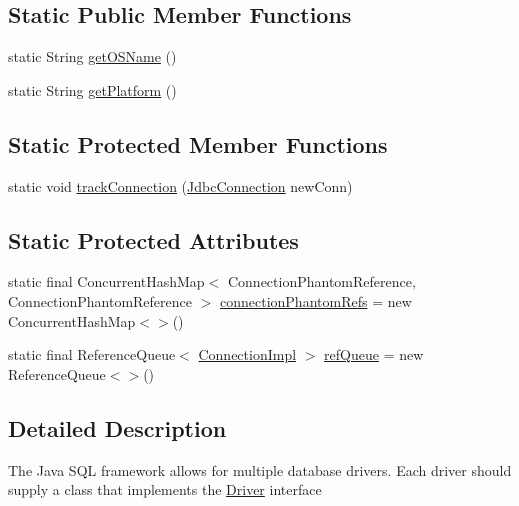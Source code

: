 \subsection*{Static Public Member Functions}
\begin{DoxyCompactItemize}
\item 
static String \mbox{\hyperlink{classcom_1_1mysql_1_1cj_1_1jdbc_1_1_non_registering_driver_a51da4d6e28d7a51a1c10daddf2376f94}{get\+O\+S\+Name}} ()
\item 
static String \mbox{\hyperlink{classcom_1_1mysql_1_1cj_1_1jdbc_1_1_non_registering_driver_add52c29486e82fccba3a92b79a6b44de}{get\+Platform}} ()
\end{DoxyCompactItemize}
\subsection*{Static Protected Member Functions}
\begin{DoxyCompactItemize}
\item 
static void \mbox{\hyperlink{classcom_1_1mysql_1_1cj_1_1jdbc_1_1_non_registering_driver_af5d0136e48b6fc7f86919ff737840950}{track\+Connection}} (\mbox{\hyperlink{interfacecom_1_1mysql_1_1cj_1_1jdbc_1_1_jdbc_connection}{Jdbc\+Connection}} new\+Conn)
\end{DoxyCompactItemize}
\subsection*{Static Protected Attributes}
\begin{DoxyCompactItemize}
\item 
static final Concurrent\+Hash\+Map$<$ Connection\+Phantom\+Reference, Connection\+Phantom\+Reference $>$ \mbox{\hyperlink{classcom_1_1mysql_1_1cj_1_1jdbc_1_1_non_registering_driver_a3c1f45389d1b114801ab9a0054a72a56}{connection\+Phantom\+Refs}} = new Concurrent\+Hash\+Map$<$$>$()
\item 
static final Reference\+Queue$<$ \mbox{\hyperlink{classcom_1_1mysql_1_1cj_1_1jdbc_1_1_connection_impl}{Connection\+Impl}} $>$ \mbox{\hyperlink{classcom_1_1mysql_1_1cj_1_1jdbc_1_1_non_registering_driver_aad570b2f650c5e4f22c47374bd2f8b6c}{ref\+Queue}} = new Reference\+Queue$<$$>$()
\end{DoxyCompactItemize}


\subsection{Detailed Description}
The Java S\+QL framework allows for multiple database drivers. Each driver should supply a class that implements the \mbox{\hyperlink{classcom_1_1mysql_1_1cj_1_1jdbc_1_1_driver}{Driver}} interface

